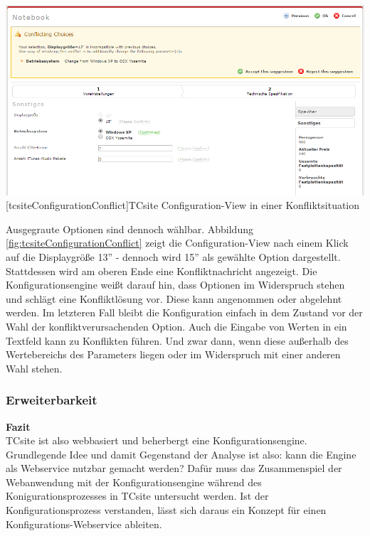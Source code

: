 \documentclass[12pt,a4paper,bibliography=totocnumbered,listof=totoc]{scrartcl}
\begin{document}
\vspace{1em}
\begin{minipage}{\linewidth}
	\centering
	\includegraphics[width=0.8\linewidth]{Abbildungen/tcsiteConfigurationConflict.PNG}
	[tcsiteConfigurationConflict]{TCsite Configuration-View in einer Konfliktsituation}
	\label{fig:tcsiteConfigurationConflict}
\end{minipage}
\vspace{1em}

Ausgegraute Optionen sind dennoch wählbar. Abbildung \ref{fig:tcsiteConfigurationConflict} zeigt die Configuration-View nach einem Klick auf die Displaygröße 13'' - dennoch wird 15'' als gewählte Option dargestellt. Stattdessen wird am oberen Ende eine Konfliktnachricht angezeigt. Die Konfigurationsengine weißt darauf hin, dass Optionen im Widerspruch stehen und schlägt eine Konfliktlösung vor. Diese kann angenommen oder abgelehnt werden. Im letzteren Fall bleibt die Konfiguration einfach in dem Zustand vor der Wahl der konfliktverursachenden Option. Auch die Eingabe von Werten in ein Textfeld kann zu Konflikten führen. Und zwar dann, wenn diese außerhalb des Wertebereichs des Parameters liegen oder im Widerspruch mit einer anderen Wahl stehen. 

\subsubsection{Erweiterbarkeit}


\textbf{Fazit}\\
TCsite ist also webbasiert und beherbergt eine Konfigurationsengine. Grundlegende Idee und damit Gegenstand der Analyse ist also: kann die Engine als Webservice nutzbar gemacht werden? Dafür muss das Zusammenspiel der Webanwendung mit der Konfigurationsengine während des Konigurationsprozesses in TCsite untersucht werden. Ist der Konfigurationsprozess verstanden, lässt sich daraus ein Konzept für einen Konfigurations-Webservice ableiten.
\end{document}
